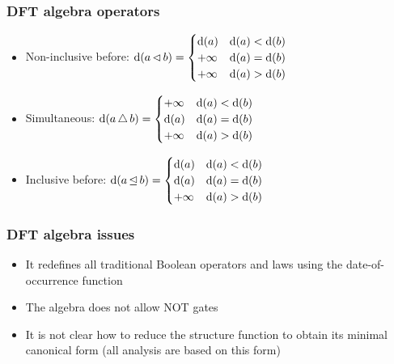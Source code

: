 \begin{frame}
\frametitle{DFT algebra operators}

\begin{itemize}
  \item Non-inclusive before:
  $
  \operatorname{d} (a \operatorname{\lhd} b) =
  \begin{cases}
  \operatorname{d}(a) & \operatorname{d}(a) < \operatorname{d}(b)\\
  +\infty & \operatorname{d}(a) = \operatorname{d}(b)\\
  +\infty & \operatorname{d}(a) > \operatorname{d}(b)\\
  \end{cases}
  $
  \item Simultaneous:
  $
  \operatorname{d} (a \operatorname{\triangle} b) =
  \begin{cases}
  +\infty & \operatorname{d}(a) < \operatorname{d}(b)\\
  \operatorname{d}(a) & \operatorname{d}(a) = \operatorname{d}(b)\\
  +\infty & \operatorname{d}(a) > \operatorname{d}(b)\\
  \end{cases}
  $
  \item Inclusive before:
  $
  \operatorname{d} (a \operatorname{\unlhd} b) =
  \begin{cases}
  \operatorname{d}(a) & \operatorname{d}(a) < \operatorname{d}(b)\\
  \operatorname{d}(a) & \operatorname{d}(a) = \operatorname{d}(b)\\
  +\infty & \operatorname{d}(a) > \operatorname{d}(b)\\
  \end{cases}
  $
\end{itemize}
\end{frame}

\begin{frame}
\frametitle{DFT algebra issues}

\begin{itemize}
  \item It redefines all traditional Boolean operators and laws using the date-of-occurrence function
  \item The algebra does not allow NOT gates
  \item It is not clear how to reduce the structure function to obtain its minimal canonical form (all analysis are based on this form)
\end{itemize}
\end{frame}